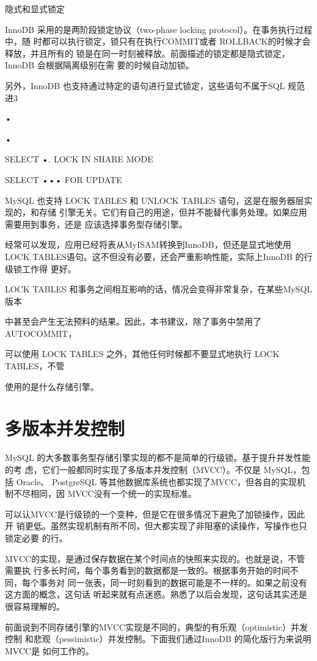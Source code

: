 隐式和显式锁定

InnoDB 采用的是两阶段锁定协议（two-phase locking protocol）。在事务执行过程中，随
时都可以执行锁定，锁只有在执行COMMIT或者 ROLLBACK的时候才会释放，并且所有的
锁是在同一时刻被释放。前面描述的锁定都是隐式锁定，InnoDB 会根据隔离级别在需
要的时候自动加锁。

另外，InnoDB 也支持通过特定的语句进行显式锁定，这些语句不属于SQL 规范进3

•

•

SELECT •. LOCK IN SHARE MODE

SELECT ••• FOR UPDATE

MySQL 也支持 LOCK TABLES 和 UNLOCK TABLES 语句，这是在服务器层实现的，和存储
引擎无关。它们有自己的用途，但并不能替代事务处理。如果应用需要用到事务，还是
应该选择事务型存储引擎。

经常可以发现，应用已经将表从MyISAM转换到InnoDB，但还是显式地使用LOCK
TABLES语句。这不但没有必要，还会严重影响性能，实际上InnoDB 的行级锁工作得
更好。

LOCK TABLES 和事务之间相互影响的话，情况会变得非常复杂，在某些MySQL版本

中甚至会产生无法预料的结果。因此，本书建议，除了事务中禁用了 AUTOCOMMIT，

可以使用 LOCK TABLES 之外，其他任何时候都不要显式地执行 LOCK TABLES，不管

使用的是什么存储引擎。

\section{多版本并发控制}
MySQL 的大多数事务型存储引擎实现的都不是简单的行级锁。基于提升并发性能的考
虑，它们一般都同时实现了多版本并发控制（MVCC）。不仅是 MySQL，包括 Oracle、
PostgreSQL 等其他数据库系统也都实现了MVCC，但各自的实现机制不尽相同，因
MVCC没有一个统一的实现标准。

可以认MVCC是行级锁的一个变种，但是它在很多情况下避免了加锁操作，因此开
销更低。虽然实现机制有所不同，但大都实现了非阻塞的读操作，写操作也只锁定必要
的行。

MVCC的实现，是通过保存数据在某个时间点的快照来实现的。也就是说，不管需要执
行多长时间，每个事务看到的数据都是一致的。根据事务开始的时间不同，每个事务对
同一张表，同一时刻看到的数据可能是不一样的。如果之前没有这方面的概念，这句话
听起来就有点迷惑。熟悉了以后会发现，这句话其实还是很容易理解的。

前面说到不同存储引擎的MVCC实现是不同的，典型的有乐观（optimistic）并发控制
和悲观（pessimistic）并发控制。下面我们通过InnoDB 的简化版行为来说明MVCC是
如何工作的。


